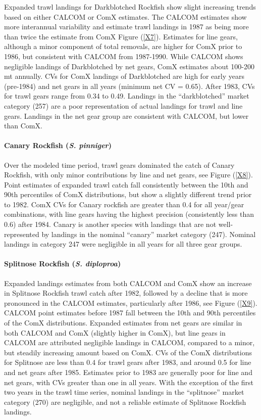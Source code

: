 \documentclass[12pt]{article}
\begin{document}
Expanded trawl landings for Darkblotched Rockfish show slight increasing 
trends based on either CALCOM or ComX estimates. The CALCOM estimates show 
more interannual variability and estimate trawl landings in 1987 as being more 
than twice the estimate from ComX Figure (\ref{X7}). Estimates for line gears, 
although a minor component of total removals, are higher for ComX prior to 
1986, but consistent with CALCOM from 1987-1990. While CALCOM shows negligible 
landings of Darkblotched by net gears, ComX estimates about 100-200 mt 
annually. CVs for ComX landings of Darkblotched are high for early years 
(pre-1984) and net gears in all years (minimum net CV = 0.65). After 1983, CVs 
for trawl gears range from 0.34 to 0.49. Landings in the ``darkblotched'' market 
category (257) are a poor representation of actual landings for trawl and line 
gears. Landings in the net gear group are consistent with CALCOM, but lower 
than ComX.  

\paragraph{Canary Rockfish (\textit{S. pinniger})}

Over the modeled time period, trawl gears dominated the catch of Canary 
Rockfish, with only minor contributions by line and net gears, see Figure (\ref{X8}). 
Point estimates of expanded trawl catch fall consistently between the 10th and 
90th percentiles of ComX distributions, but show a slightly different trend 
prior to 1982. ComX CVs for Canary rockfish are greater than 0.4 for all 
year/gear combinations, with line gears having the highest precision 
(consistently less than 0.6) after 1984. Canary is another species with 
landings that are not well-represented by landings in the nominal ``canary'' 
market category (247). Nominal landings in category 247 were negligible in all 
years for all three gear groups.

\paragraph{Splitnose Rockfish (\textit{S. diploproa})}

Expanded landings estimates from both CALCOM and ComX show an increase in 
Splitnose Rockfish trawl catch after 1982, followed by a decline that is more 
pronounced in the CALCOM estimates, particularly after 1986, see Figure (\ref{X9}). 
CALCOM point estimates before 1987 fall between the 10th and 90th percentiles 
of the ComX distributions. Expanded estimates from net gears are similar in 
both CALCOM and ComX (slightly higher in ComX), but line gears in CALCOM are 
attributed negligible landings in CALCOM, compared to a minor, but steadily 
increasing amount based on ComX. CVs of the ComX distributions for Splitnose 
are less than 0.4 for trawl gears after 1983, and around 0.5 for line and net 
gears after 1985. Estimates prior to 1983 are generally poor for line and net 
gears, with CVs greater than one in all years. With the exception of the first 
two years in the trawl time series, nominal landings in the ``splitnose'' market 
category (270) are negligible, and not a reliable estimate of Splitnose 
Rockfish landings.
\end{document}
